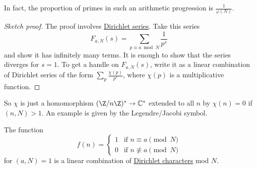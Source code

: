 \documentclass{article}
\begin{document}

In fact, the proportion of primes in such an arithmetic progression is $\frac{1}{\varphi(N)}$.
\begin{proof}[Sketch proof]
    The proof involves \hyperlink{def:dirichlet}{Dirichlet series}. Take this series
    \begin{equation*}
        F_{a,N}(s) = \sum_{p \equiv a \bmod{N}} \frac{1}{p^s}
    \end{equation*}
    and show it has infinitely many terms. It is enough to show that the series diverges for $s=1$.
    To get a handle on $F_{a,N}(s)$, write it as a linear combination of Dirichlet series of the form $\sum_p \frac{\chi(p)}{p^s}$, where $\chi(p)$ is a multiplicative function.
\end{proof}

So $\chi$ is just a homomorphism $(\Z/n\Z)^* \to \mathbb{C}^*$ extended to all $n$ by $\chi(n) = 0$ if $(n, N)>1$.
An example is given by the Legendre/Jacobi symbol.

\begin{fact}
    The function
    \begin{equation*}
        f(n) =
        \begin{cases}
            1 & \text{if } n\equiv a \pmod{N} \\
            0 & \text{if } n\not\equiv a \pmod{N}
        \end{cases}
    \end{equation*}
    for $(a,N)=1$ is a linear combination of \hyperlink{def:char}{Dirichlet characters} mod $N$.
\end{fact}
\end{document}
